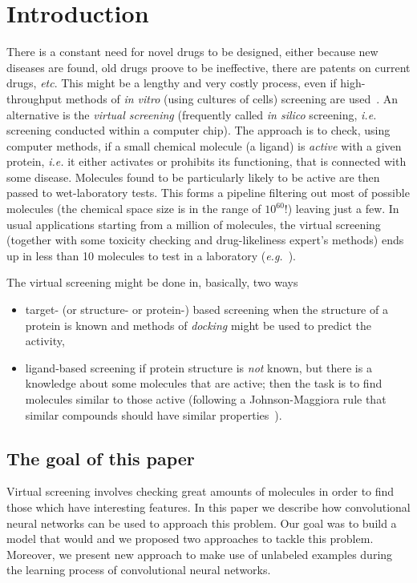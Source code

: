 \documentclass[a4paper,10pt]{report}
\begin{document}
  \chapter{Introduction}
      There is a constant need for novel drugs to be designed, either because new diseases are found, old drugs proove to be ineffective, there are patents on current drugs, \textit{etc}. This might be a lengthy and very costly process, even if high-throughput methods of \textit{in vitro} (using cultures of cells) screening are used~\cite{Breda2008}. An alternative is the \textit{virtual screening} (frequently called \textit{in silico} screening, \textit{i.e.} screening conducted within a computer chip). The approach is to check, using computer methods, if a small chemical molecule (a ligand) is \textit{active} with a given protein, \textit{i.e.} it either activates or prohibits its functioning, that is connected with some disease. Molecules found to be particularly likely to be active are then passed to wet-laboratory tests. This forms a pipeline filtering out most of possible molecules (the chemical space size is in the range of $10^{60}$!) leaving just a few. In usual applications starting from a million of molecules, the virtual screening (together with some toxicity checking and drug-likeliness expert's methods) ends up in less than 10 molecules to test in a laboratory (\textit{e.g.}~\cite{Pethukov2006}).

	  The virtual screening might be done in, basically, two ways~\cite{Geppert2010,Varnek2012}
	  \begin{itemize}
      \item target- (or structure- or protein-) based screening when the structure of a protein is known and methods of \textit{docking} might be used to predict the activity,
      \item ligand-based screening if protein structure is \textit{not} known, but there is a knowledge about some molecules that are active; then the task is to find molecules similar to those active (following a Johnson-Maggiora rule that similar compounds should have similar properties~\cite{Varnek2012}).
      \end{itemize}
  
    \section{The goal of this paper}
    
     Virtual screening involves checking great amounts of molecules in order to find those which have interesting features. In this paper we describe how convolutional neural networks can be used to approach this problem. Our goal was to build a model that would and we proposed two approaches to tackle this problem. Moreover, we present new approach to make use of unlabeled examples during the learning process of convolutional neural networks.
    
\end{document}
